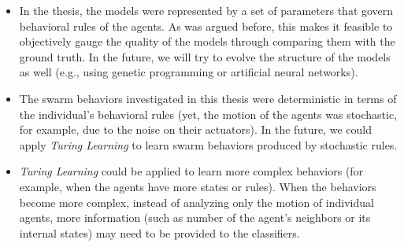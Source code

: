 \begin{itemize}

\item In the thesis, the models were represented by a set of parameters that govern behavioral rules of the agents. As was argued before, this makes it feasible to objectively gauge the quality of the models through comparing them with the ground truth. In the future, we will try to evolve the structure of the models as well (e.g., using genetic programming or artificial neural networks). 

\item The swarm behaviors investigated in this thesis were deterministic in terms of the individual's behavioral rules (yet, the motion of the agents was stochastic, for example, due to the noise on their actuators). In the future, we could apply \textit{Turing Learning} to learn swarm behaviors produced by stochastic rules. 

\item \textit{Turing Learning} could be applied to learn more complex behaviors (for example, when the agents have more states or rules). When the behaviors become more complex, instead of analyzing only the motion of individual agents, more information (such as number of the agent's neighbors or its internal states) may need to be provided to the classifiers.



\end{itemize}
